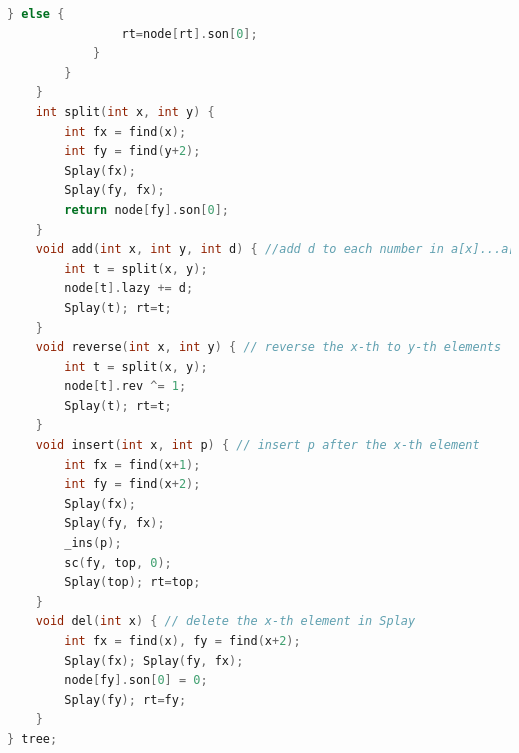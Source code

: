 \documentclass{article}
\begin{document}
\begin{lstlisting}[language=C++]
			} else {
				rt=node[rt].son[0];
			}
		}
	}
	int split(int x, int y) {
		int fx = find(x);
		int fy = find(y+2);
		Splay(fx);
		Splay(fy, fx);
		return node[fy].son[0];
	}
	void add(int x, int y, int d) { //add d to each number in a[x]...a[y]
		int t = split(x, y);
		node[t].lazy += d;
		Splay(t); rt=t;
	}
	void reverse(int x, int y) { // reverse the x-th to y-th elements
		int t = split(x, y);
		node[t].rev ^= 1;
		Splay(t); rt=t;
	}
	void insert(int x, int p) { // insert p after the x-th element
		int fx = find(x+1);
		int fy = find(x+2);
		Splay(fx);
		Splay(fy, fx);
		_ins(p);
		sc(fy, top, 0);
		Splay(top); rt=top;
	}
	void del(int x) { // delete the x-th element in Splay
		int fx = find(x), fy = find(x+2);
		Splay(fx); Splay(fy, fx);
		node[fy].son[0] = 0;
		Splay(fy); rt=fy;
	}
} tree;
\end{lstlisting}
\newpage
\end{document}
